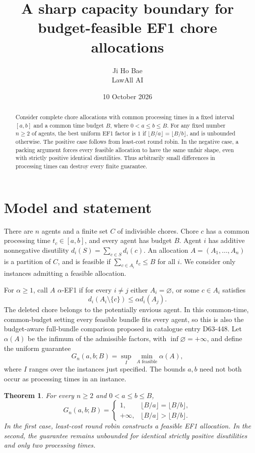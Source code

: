 \documentclass[11pt]{article}
\title{A sharp capacity boundary for budget-feasible EF1 chore allocations}
\author{Ji Ho Bae\\\small LawAll AI}
\date{10 October 2026}
\newtheorem{theorem}{Theorem}
\begin{document}
\maketitle
\begin{abstract}
Consider complete chore allocations with common processing times in a fixed
interval $[a,b]$ and a common time budget $B$, where $0<a\le b\le B$.
For any fixed number $n\ge2$ of agents, the best uniform EF1 factor is $1$
if $\lfloor B/a\rfloor=\lfloor B/b\rfloor$, and is unbounded otherwise.
The positive case follows from least-cost round robin. In the negative case,
a packing argument forces every feasible allocation to have the same unfair
shape, even with strictly positive identical disutilities. Thus arbitrarily
small differences in processing times can destroy every finite guarantee.
\end{abstract}

\section{Model and statement}

There are $n$ agents and a finite set $C$ of indivisible chores. Chore $c$
has a common processing time $t_c\in[a,b]$, and every agent has budget $B$.
Agent $i$ has additive nonnegative disutility
$d_i(S)=\sum_{c\in S}d_i(c)$. An allocation $A=(A_1,\ldots,A_n)$ is a
partition of $C$, and is feasible if $\sum_{c\in A_i}t_c\le B$ for all $i$.
We consider only instances admitting a feasible allocation.

For $\alpha\ge1$, call $A$ $\alpha$-EF1 if for every $i\ne j$ either
$A_i=\varnothing$, or some $c\in A_i$ satisfies
\[
                     d_i(A_i\setminus\{c\})\le\alpha d_i(A_j).
\]
The deleted chore belongs to the potentially envious agent. In this common-time,
common-budget setting every feasible bundle fits every agent, so this is also
the budget-aware full-bundle comparison proposed in catalogue entry D63-448.
Let $\alpha(A)$ be the infimum of the admissible factors, with
$\inf\varnothing=+\infty$, and define the uniform guarantee
\[
 G_n(a,b;B)=\sup_I\ \min_{A\text{ feasible}}\alpha(A),
\]
where $I$ ranges over the instances just specified. The bounds $a,b$ need not
both occur as processing times in an instance.

\begin{theorem}\label{thm:boundary}
For every $n\ge2$ and $0<a\le b\le B$,
\[
 G_n(a,b;B)=
 \begin{cases}
  1,&\lfloor B/a\rfloor=\lfloor B/b\rfloor,\\
  +\infty,&\lfloor B/a\rfloor>\lfloor B/b\rfloor.
 \end{cases}
\]
In the first case, least-cost round robin constructs a feasible EF1 allocation.
In the second, the guarantee remains unbounded for identical strictly positive
disutilities and only two processing times.
\end{theorem}
\end{document}
